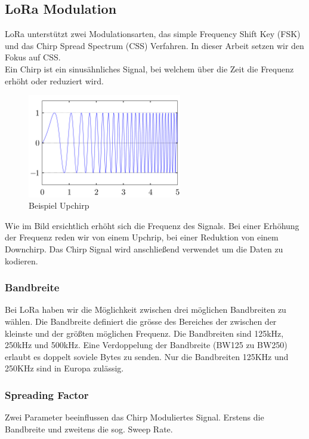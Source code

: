\documentclass[11pt,english,german]{report}
\theoremstyle{definition}
\begin{document}
\subsection{LoRa Modulation}
LoRa unterstützt zwei Modulationsarten, das simple Frequency Shift Key (FSK) und das Chirp Spread Spectrum (CSS) Verfahren. In dieser Arbeit setzen wir den Fokus auf CSS.\\[0.3cm]
Ein Chirp ist ein sinusähnliches Signal, bei welchem über die Zeit die Frequenz erhöht oder reduziert wird.
\begin{figure}[H]
	\centering
	\includegraphics[width=0.6\textwidth]{img/lora/upchirp.png}
	\caption[Beispiel Upchirp]
	{Beispiel Upchirp}
\end{figure}
\noindent
Wie im Bild ersichtlich erhöht sich die Frequenz des Signals. Bei einer Erhöhung der Frequenz reden wir von einem Upchrip, bei einer Reduktion von einem Downchirp. Das Chirp Signal wird anschließend verwendet um die Daten zu kodieren.

\subsubsection{Bandbreite}
Bei LoRa haben wir die Möglichkeit zwischen drei möglichen Bandbreiten zu wählen. Die Bandbreite definiert die grösse des Bereiches der zwischen der kleinste und der größten möglichen Frequenz. Die Bandbreiten sind 125kHz, 250kHz und 500kHz. Eine Verdoppelung der Bandbreite (BW125 zu BW250) erlaubt es doppelt soviele Bytes zu senden. Nur die Bandbreiten 125KHz und 250KHz sind in Europa zulässig. %

\newpage
\subsubsection{Spreading Factor}
Zwei Parameter beeinflussen das Chirp Moduliertes Signal. Erstens die Bandbreite und zweitens die sog. Sweep Rate.
\end{document}
